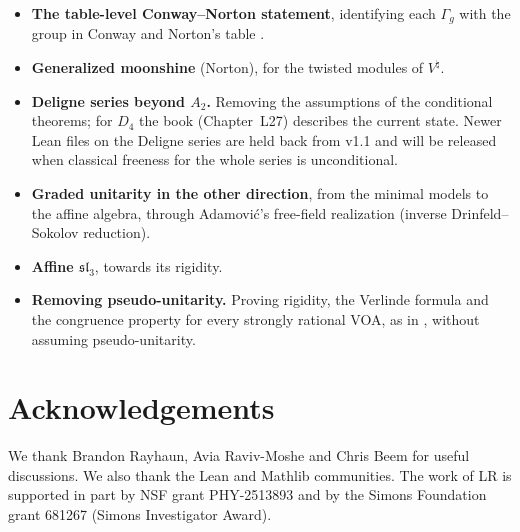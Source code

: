 \documentclass[10pt]{article}
\newcommand{\slthree}{\mathfrak{sl}_3}
\begin{document}
\begin{itemize}
  \item \textbf{The table-level Conway--Norton statement}, identifying each $\Gamma_g$ with the group in Conway and
    Norton's table \cite{ConwayNorton}.
  \item \textbf{Generalized moonshine} (Norton), for the twisted modules of $V^\natural$.
  \item \textbf{Deligne series beyond $A_2$.} Removing the assumptions of the conditional theorems; for $D_4$ the
    book (Chapter~L27) describes the current state. Newer Lean files on the Deligne series are held back from v1.1
    and will be released when classical freeness for the whole series is unconditional.
  \item \textbf{Graded unitarity in the other direction}, from the minimal models to the affine algebra, through
    Adamovi\'c's free-field realization (inverse Drinfeld--Sokolov reduction).
  \item \textbf{Affine $\slthree$}, towards its rigidity.
  \item \textbf{Removing pseudo-unitarity.} Proving rigidity, the Verlinde formula and the congruence property for
    every strongly rational VOA, as in \cite{HuangRigidity,HuangVerlinde,DongLinNg}, without assuming
    pseudo-unitarity.
\end{itemize}

\section*{Acknowledgements}
We thank Brandon Rayhaun, Avia Raviv-Moshe and Chris Beem for useful discussions. We also thank the Lean and
Mathlib communities. The work of LR is supported in part by NSF grant PHY-2513893 and by the Simons Foundation
grant 681267 (Simons Investigator Award).
\end{document}
